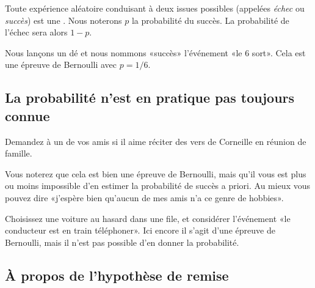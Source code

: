 \begin{definition}
    Toute expérience aléatoire conduisant à deux issues possibles (appelées \emph{échec} ou \emph{succès}) est une . Nous noterons \( p\) la probabilité du succès. La probabilité de l'échec sera alors \( 1-p\).
\end{definition}

\begin{example}
    Nous lançons un dé et nous nommons «succès» l'événement «le \( 6\) sort». Cela est une épreuve de Bernoulli avec \( p=1/6\).
\end{example}


\subsection{La probabilité n'est en pratique pas toujours connue}

\begin{example}
    Demandez à un de vos amis si il aime réciter des vers de Corneille en réunion de famille.

    Vous noterez que cela est bien une épreuve de Bernoulli, mais qu'il vous est plus ou moins impossible d'en estimer la probabilité de succès a priori. Au mieux vous pouvez dire «j'espère bien qu'aucun de mes amis n'a ce genre de hobbies».
    
\end{example}

\begin{example}
    Choisissez une voiture au hasard dans une file, et considérer l'événement «le conducteur est en train téléphoner». Ici encore il s'agit d'une épreuve de Bernoulli, mais il n'est pas possible d'en donner la probabilité.
\end{example}


\subsection{À propos de l'hypothèse de remise}

